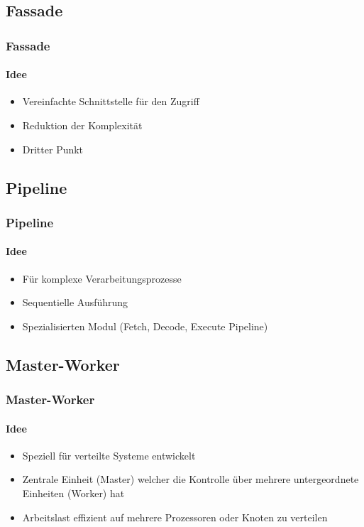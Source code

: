 \subsection{Fassade}
\begin{frame}
  \frametitle{Fassade}
  \framesubtitle{Idee}
  \begin{itemize}
    \item Vereinfachte Schnittstelle für den Zugriff 
    \item Reduktion der Komplexität
    \item Dritter Punkt
  \end{itemize}
\end{frame}


\subsection{Pipeline}
\begin{frame}
  \frametitle{Pipeline}
  \framesubtitle{Idee}
  \begin{itemize}
    \item Für komplexe Verarbeitungsprozesse
    \item Sequentielle Ausführung
    \item Spezialisierten Modul (Fetch, Decode, Execute Pipeline)
  \end{itemize}
\end{frame}

\subsection{Master-Worker}
\begin{frame}
  \frametitle{Master-Worker}
  \framesubtitle{Idee}
  \begin{itemize}
    \item Speziell für verteilte Systeme entwickelt
    \item Zentrale Einheit (Master) welcher die Kontrolle über mehrere untergeordnete Einheiten (Worker) hat
    \item Arbeitslast effizient auf mehrere Prozessoren oder Knoten zu verteilen
  \end{itemize}
\end{frame}